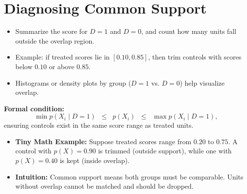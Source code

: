 \documentclass[12pt]{article}
\begin{document}
\section*{\noindent\textbf{Diagnosing Common Support}}

\begin{itemize}
    \item Summarize the score for $D=1$ and $D=0$, and count how many units fall outside the overlap region.
    \item Example: if treated scores lie in $[0.10, 0.85]$, then trim controls with scores below $0.10$ or above $0.85$.
    \item Histograms or density plots by group ($D=1$ vs. $D=0$) help visualize overlap.
\end{itemize}

\textbf{Formal condition:}
\[
\min p(X_i \mid D=1) \;\; \leq \;\; p(X_i) \;\; \leq \;\; \max p(X_i \mid D=1),
\]
ensuring controls exist in the same score range as treated units.

\begin{itemize}
    \item \textbf{Tiny Math Example:} Suppose treated scores range from $0.20$ to $0.75$. A control with $p(X)=0.90$ is trimmed (outside support), while one with $p(X)=0.40$ is kept (inside overlap).  
    \item \textbf{Intuition:} Common support means both groups must be comparable. Units without overlap cannot be matched and should be dropped.  
\end{itemize}
\end{document}
